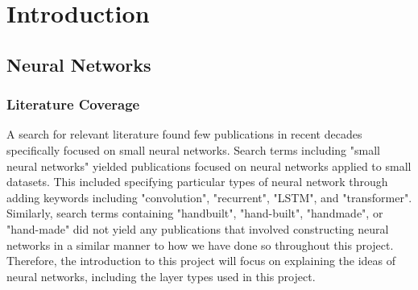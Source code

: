\documentclass{somasmsc}
\begin{document}
\newcommand{\yourtitle}{Small Neural Networks with Interesting Architectures}
\newcommand{\yourname}{Reg. 210138711}


\pagestyle{empty}
\frontmatter
\maketitle
\pagestyle{plain}
\tableofcontents
\newpage



\setlength{\headheight}{16pt}
\fancyhead{}
\fancyfoot{}
\pagestyle{fancy}
\fancyhead[RO,LE]{\thepage}
\fancyhead[LO,RE]{\rightmark}

\newcommand{\studentcomment}[1]{\todo[inline, backgroundcolor=blue!30]{\textsc{\yourname:} #1}}
\newcommand{\DSWcomment}[1]{\todo[inline, backgroundcolor=green!30]{\textsc{DSW:} #1}}
\newcommand{\supcomment}[1]{\todo[inline, backgroundcolor=red!30]{\textsc{Supervisor:} #1}}

\mainmatter



\chapter{Introduction}\label{intro}

\section{Neural Networks}

\subsection{Literature Coverage}

A search for relevant literature found few publications in recent decades specifically focused on small neural networks. Search terms including "small neural networks" yielded publications focused on neural networks applied to small datasets. This included specifying particular types of neural network through adding keywords including "convolution", "recurrent", "LSTM", and "transformer". Similarly, search terms containing "handbuilt", "hand-built", "handmade", or "hand-made" did not yield any publications that involved constructing neural networks in a similar manner to how we have done so throughout this project. Therefore, the introduction to this project will focus on explaining the ideas of neural networks, including the layer types used in this project.
\end{document}
